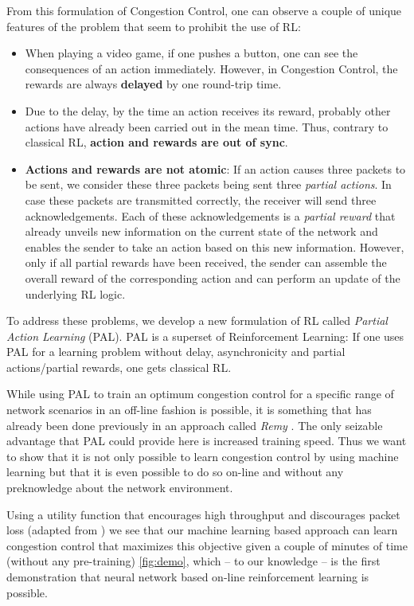 \documentclass[sigconf]{acmart}
\begin{document}
From this formulation of Congestion Control, one can observe a couple of unique features of the problem that seem to prohibit the use of RL: \begin{itemize}
\item When playing a video game, if one pushes a button, one can see the consequences of an action immediately. However, in Congestion Control, the rewards are always \textbf{delayed} by one round-trip time.
\item Due to the delay, by the time an action receives its reward, probably other actions have already been carried out in the mean time. Thus, contrary to classical RL, \textbf{action and rewards are out of sync}. 
\item \textbf{Actions and rewards are not atomic}: If an action causes three packets to be sent, we consider these three packets being sent three \textit{partial actions}. In case these packets are transmitted correctly, the receiver will send three acknowledgements. Each of these acknowledgements is a \textit{partial reward} that already unveils new information on the current state of the network and enables the sender to take an action based on this new information. However, only if all partial rewards have been received, the sender can assemble the overall reward of the corresponding action and can perform an update of the underlying RL logic. 
\end{itemize}

To address these problems, we develop a new formulation of RL called \textit{Partial Action Learning} (PAL). PAL is a superset of Reinforcement Learning: If one uses PAL for a learning problem without delay, asynchronicity and partial actions/partial rewards, one gets classical RL.

While using PAL to train an optimum congestion control for a specific range of network scenarios in an off-line fashion is possible, it is something that has already been done previously in an approach called \textit{Remy} \citep{winstein_tcp_2013}. The only seizable advantage that PAL could provide here is increased training speed. Thus we want to show that it is  not only possible to learn congestion control by using machine learning but that it is even possible to do so on-line and without any preknowledge about the network environment.

Using a utility function that encourages high throughput and discourages packet loss (adapted from \citep{dong_pcc:_2015}) we see that our machine learning based approach can learn congestion control that maximizes this objective given a couple of minutes of time (without any pre-training) \ref{fig:demo}, which -- to our knowledge -- is the first demonstration that neural network based on-line reinforcement learning is possible. 
\end{document}
